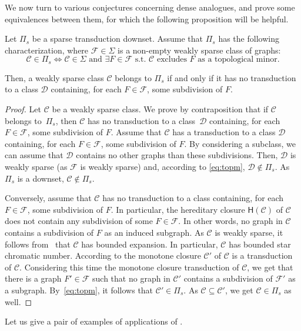\documentclass{lmcs}
\newcommand{\Cc}{\mathscr{C}}
\newcommand{\Dd}{\mathscr{D}}
\newcommand{\Ff}{\mathscr{F}}
\theoremstyle{definition}
\newcommand{\dset}{downset\xspace}
\begin{document}
We now turn to various conjectures concerning dense analogues, and prove some equivalences between them, for which the following proposition will be helpful.

\begin{prop}
	\label{prop:topmin}
	Let $\Pi_s$ be a sparse transduction \dset.
	Assume that $\Pi_s$ has the following characterization, where
	$\Ff\in\Sigma$  is a  non-empty weakly sparse class of graphs: 
	\begin{equation}
		\label{eq:topm}
	\Cc\in\Pi_s\iff \Cc\in\Sigma\text{ and }\exists F\in\Ff\text{ s.t. }\Cc\text{ excludes $F$ as a topological minor.}
\end{equation}
	
	
	Then, a weakly sparse class $\Cc$ belongs to $\Pi_s$ if and only if it has no transduction to a class $\Dd$ containing, for each $F\in\Ff$, some subdivision of $F$.
\end{prop}
\begin{proof}
	Let $\Cc$ be a weakly sparse class. We prove by contraposition that if $\Cc$ belongs to~$\Pi_s$, then $\Cc$ has no transduction to a class~$\Dd$ containing, for each $F\in\Ff$, some subdivision of $F$.
	Assume that $\Cc$ 
	has a transduction to a class $\Dd$ containing, for each $F\in\Ff$, some subdivision of $F$.
	By considering a subclass, we can assume that $\Dd$ contains no other graphs than these subdivisions. Then, $\Dd$ is weakly sparse (as $\Ff$ is weakly sparse) and, according to \eqref{eq:topm}, $\Dd\notin\Pi_s$. As $\Pi_s$ is a \dset, $\Cc\notin\Pi_s$. 


	Conversely,	assume that $\Cc$ has  no transduction to a class containing, for each $F\in\Ff$, some subdivision of $F$.
	In particular, the hereditary closure $\mathsf H(\Cc)$ of $\Cc$ does not contain any subdivision of some $F\in\Ff$.
	In other words, no graph in $\Cc$ contains a subdivision of $F$ as an induced subgraph.
	As $\Cc$ is weakly sparse, it follows from~\cite{DVORAK2018143} that $\Cc$ has bounded expansion.  In particular, $\Cc$ has bounded star chromatic number. According to   the
	monotone closure $\Cc'$ of $\Cc$ is a transduction of $\Cc$. Considering this time the monotone closure transduction of $\Cc$, we get that there is a graph $F'\in\Ff$ such that 
	no graph in $\Cc'$ contains a subdivision of $\Ff'$ as a subgraph. By~\eqref{eq:topm}, it follows that $\Cc'\in\Pi_s$. As $\Cc\subseteq \Cc'$, we get $\Cc\in\Pi_s$ as well.
\end{proof}


Let us give a pair of examples of applications of .
\end{document}
